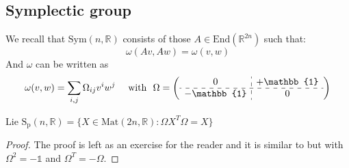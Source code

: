 \documentclass[../main.tex]{subfiles}
\begin{document}
\subsection{Symplectic group}
We recall that $\textrm{Sym}(n,\mathbb{R})$ consists of those $A\in\textrm{End}(\mathbb{R}^{2n})$ such that:
\[
\omega(Av,Aw)=\omega(v,w)
\]
And $\omega$ can be written as
\[
\omega(v,w)=\sum_{i,j}\Omega_{ij}v^iw^j \quad \text{ with }\ \Omega=
\left(
\begin{array}{c:c}
    0 & +\mathbb{1} \\
    \hdashline
    -\mathbb{1} & 0
\end{array}
\right)
\]
\begin{proposition}
Lie $\text{S}_\text{p}(n,\mathbb{R})=\{X\in\text{Mat}(2n,\mathbb{R}):\Omega X^T\Omega=X\}$
\end{proposition}
\begin{proof}
The proof is left as an exercise for the reader and it is similar to  but with {\color{red}$\Omega^2=-\mathbb{1}$} and {\color{red}$\Omega^T=-\Omega$}.
\end{proof}
\end{document}
